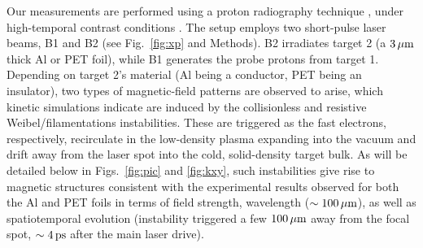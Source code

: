 \documentclass[aps,twocolumn,showpacs,superscriptaddress]{revtex4}
\begin{document}
Our measurements are performed using a proton radiography technique \cite{LPB_Borghesi_2002}, under high-temporal contrast conditions \cite{RSI_Albertazzi_2015}. The setup employs two short-pulse laser beams, B1 and B2 (see Fig.~\ref{fig:xp} and Methods). B2 irradiates target 2 (a $3\,\rm \mu m$ thick Al or PET foil), while B1 generates the probe protons from target 1. Depending on target 2's material (Al being a conductor, PET being an insulator), two types of magnetic-field patterns are observed to arise, which kinetic simulations indicate are induced by the collisionless and resistive Weibel/filamentations instabilities. These are triggered as the fast electrons, respectively, recirculate in the low-density plasma expanding into the vacuum and drift away from the laser spot into the cold, solid-density target bulk. As will be detailed below in Figs.~\ref{fig:pic} and \ref{fig:kxy}, such instabilities give rise to magnetic structures consistent with the experimental results observed for both the Al and PET foils in terms of field strength, wavelength ($\sim 100\,\rm \mu m$), as well as spatiotemporal evolution (instability triggered a few $100\,\rm \mu m$ away from the focal spot, $\sim 4\,\rm ps$ after the main laser drive).
%
\end{document}
